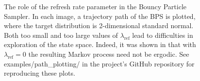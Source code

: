 \documentclass[report.tex]{subfiles}
\begin{document}
\begin{figure}
  \caption{The role of the refresh rate parameter in the Bouncy Particle Sampler.
           In each image, a trajectory path of the BPS is plotted, where
           the target distribution is 2-dimensional standard normal.
           Both too small and too large values of $\lambda_{\text{ref}}$ lead to
           difficulties in exploration of the state space. Indeed, it was shown
           in \citet{bouchard2015bouncy} that with $\lambda_{\text{ref}} = 0$ the
           resulting Markov process need not be ergodic.
           See examples/path\_plotting/ in the project's GitHub repository for
           reproducing these plots.}
  \label{image-bps-refresh-rates}
\end{figure}
\end{document}
